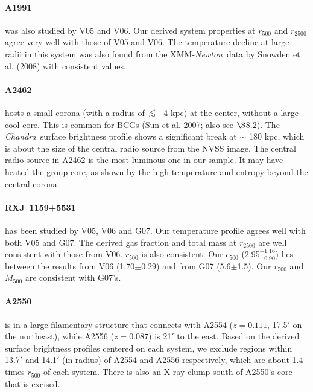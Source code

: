 \documentclass{aastex}
\newcommand{\lsim}{\mbox{\hspace{.2em}\raisebox{.5ex}{$<$}\hspace{-.8em}\raisebox{-.5ex}{$\sim$}
\hspace{.2em}}}
\def\chandra    {{\em Chandra}\/}
\def\xmm        {XMM-{\em Newton}\/}
\begin{document}
\begin{appendix}
\paragraph{A1991} was also studied by V05 and V06. Our derived system properties
at $r_{500}$ and $r_{2500}$ agree very well
with those of V05 and V06. The temperature decline at large radii in this system
was also found from the \xmm\ data by Snowden et al. (2008) with consistent values.

\paragraph{A2462} hosts a small corona (with a radius of $\lsim$ 4 kpc)
at the center, without a large cool core. This is common for BCGs
(Sun et al. 2007; also see $\S$8.2). The \chandra\ surface brightness
profile shows a significant break at $\sim$ 180 kpc, which is about the size
of the central radio source from the NVSS image. The central radio source in A2462 is the most
luminous one in our sample. It may have heated the group core, as shown by the
high temperature and entropy beyond the central corona.

\paragraph{RXJ~1159+5531} has been studied by V05, V06 and G07. Our temperature
profile agrees well with both V05 and G07. The derived gas fraction and total mass
at $r_{2500}$ are well consistent with those from V06. $r_{500}$ is also consistent.
Our $c_{500}$ (2.95$^{+1.16}_{-0.90}$) lies between the results from V06 (1.70$\pm$0.29)
and from G07 (5.6$\pm$1.5). Our $r_{500}$ and $M_{500}$ are consistent with G07's.

\paragraph{A2550} is in a large filamentary structure that connects with A2554
($z=0.111$, 17.5$'$ on the northeast), while A2556 ($z=0.087$) is 21$'$ to the east.
Based on the derived surface brightness profiles centered on each system, we exclude
regions within 13.7$'$ and 14.1$'$ (in radius) of A2554 and A2556 respectively,
which are about 1.4 times $r_{500}$ of each system.
There is also an X-ray clump south of A2550's core that is excised.

\end{appendix}
\end{document}
